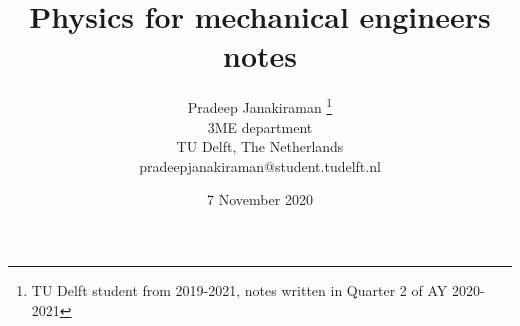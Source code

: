 \documentclass[a4paper, reqno, 12pt, openbib]{article} %
\begin{document}
\title{Physics for mechanical engineers notes}
\author{Pradeep Janakiraman \thanks{TU Delft student from 2019-2021, notes written in Quarter 2 of AY 2020-2021}\\
3ME department\\
TU Delft, The Netherlands\\
pradeepjanakiraman@student.tudelft.nl}
\date{7 November 2020}
\maketitle
\newpage
\tableofcontents
\newpage


\end{document}
